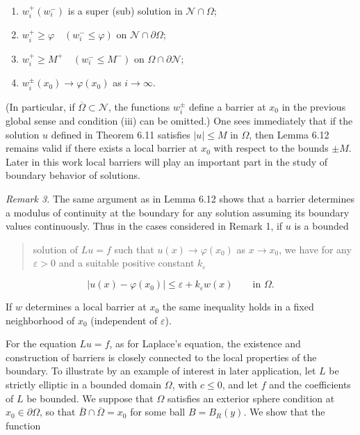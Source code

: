 \begin{enumerate}
\item[(i)] $w_i^+ (w_i^-)$ is a super (sub) solution in $\mathcal N \cap \Omega$;
\item[(ii)] $w_i^+ \geq \varphi \quad (w_i^- \leq \varphi)$ on $\mathcal N \cap \partial\Omega$;
\item[(iii)] $w_i^+ \geq M^+ \quad (w_i^- \leq M^-)$ on $\Omega \cap \partial\mathcal N$;
\item[(iv)] $w_i^\pm(x_0) \to \varphi(x_0)$ as $i \to \infty$.
\end{enumerate}

\noindent (In particular, if $\overline{\Omega}\subset \mathcal N$, the functions $w_i^\pm$ define a barrier at $x_0$ in the previous global sense and condition (iii) can be omitted.) One sees immediately that if the solution $u$ defined in Theorem 6.11 satisfies $|u|\leq M$ in $\Omega$, then Lemma 6.12 remains valid if there exists a local barrier at $x_0$ with respect to the bounds $\pm M$. Later in this work local barriers will play an important part in the study of boundary behavior of solutions.

\medskip

\noindent\textit{Remark 3.} \quad The same argument as in Lemma 6.12 shows that a barrier determines a modulus of continuity at the boundary for any solution assuming its boundary values continuously. Thus in the cases considered in Remark 1, if $u$ is a bounded


\begin{quote}
solution of $Lu=f$ such that $u(x)\to\varphi(x_{0})$ as $x\to x_{0}$, we have for any $\varepsilon>0$ and a suitable positive constant $k_{\varepsilon}$
\end{quote}

\[
|u(x)-\varphi(x_{0})|\leq \varepsilon+k_{\varepsilon}w(x)\qquad \text{in }\Omega.
\]

If $w$ determines a local barrier at $x_{0}$ the same inequality holds in a fixed neighborhood of $x_{0}$ (independent of $\varepsilon$).

For the equation $Lu=f$, as for Laplace's equation, the existence and construction of barriers is closely connected to the local properties of the boundary. To illustrate by an example of interest in later application, let $L$ be strictly elliptic in a bounded domain $\Omega$, with $c\leq 0$, and let $f$ and the coefficients of $L$ be bounded. We suppose that $\Omega$ satisfies an exterior sphere condition at $x_{0}\in\partial\Omega$, so that $\overline{B}\cap\overline{\Omega}=x_{0}$ for some ball $B=B_{R}(y)$. We show that the function

